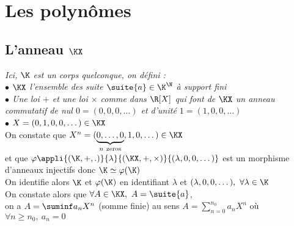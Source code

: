 	\section{Les polynômes}
	\subsection{L'anneau $\KX$}
		\textit{Ici, $\K$ est un corps quelconque, on défini :\\
		\hspace*{2cm} $\bullet$ $\KX$ l'ensemble des suite $\suite{a}\in\K^\N$ à support fini \\
		\hspace*{2cm} $\bullet$ Une loi $+$ et une loi $\times$ comme dans $\R[X]$ qui font de $\KX$ un anneau commutatif de nul $0=(0,0,0,\dots)$ et d'unité $1=(1,0,0,\dots)$\\
		\hspace*{2cm} $\bullet$  $X=(0,1,0,0,\dots ) \in \KX$} \vspace*{0.5cm} \\
		On constate que $X^n = (\underbrace{0,\dots ,0}_{n~\mathrm{zeros}},1,0,\dots) \in\KX$\\
		et que $\varphi \appli{(\K ,+,.)}{\lambda}{(\KX , + , \times)}{(\lambda ,0,0,\dots)}$ est un morphisme d'anneaux injectifs donc $\K \simeq \varphi(\K)$\\
		On identifie alors $\K$ et $\varphi(\K)$ en identifiant $\lambda$ et $(\lambda,0,0,\dots) ,~\forall \lambda\in \K$\vspace*{0.5cm} \\
		On constate alors que $\forall A\in \KX ,~A=\suite{a}$, \\ on a $A=\suminf a_nX^n$ {\footnotesize (somme finie)} au sens $A=\sum\limits_{n=0}^{n_0} a_nX^n$ où $\forall n\geq n_0 ,~ a_n = 0$ \traitd
